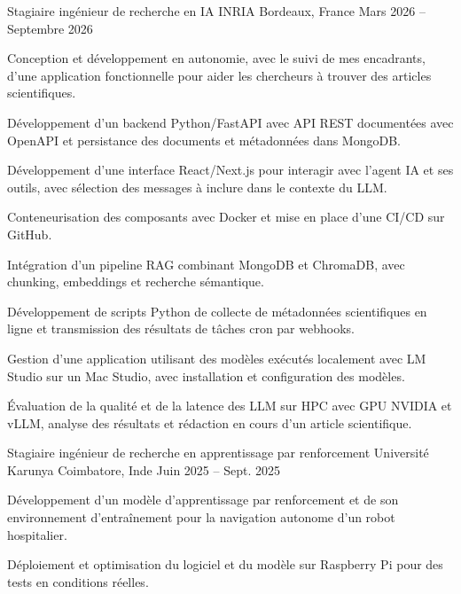 
\begin{cventries}
  \cventry
    {Stagiaire ingénieur de recherche en IA}
    {INRIA}
    {Bordeaux, France}
    {Mars 2026 -- Septembre 2026}
    {
      \begin{cvitems}
        \item {Conception et développement en autonomie, avec le suivi de mes encadrants, d’une application fonctionnelle pour aider les chercheurs à trouver des articles scientifiques.}
        \item {Développement d’un backend Python/FastAPI avec API REST documentées avec OpenAPI et persistance des documents et métadonnées dans MongoDB.}
        \item {Développement d’une interface React/Next.js pour interagir avec l’agent IA et ses outils, avec sélection des messages à inclure dans le contexte du LLM.}
        \item {Conteneurisation des composants avec Docker et mise en place d’une CI/CD sur GitHub.}
        \item {Intégration d’un pipeline RAG combinant MongoDB et ChromaDB, avec chunking, embeddings et recherche sémantique.}
        \item {Développement de scripts Python de collecte de métadonnées scientifiques en ligne et transmission des résultats de tâches cron par webhooks.}
        \item {Gestion d’une application utilisant des modèles exécutés localement avec LM Studio sur un Mac Studio, avec installation et configuration des modèles.}
        \item {Évaluation de la qualité et de la latence des LLM sur HPC avec GPU NVIDIA et vLLM, analyse des résultats et rédaction en cours d’un article scientifique.}
      \end{cvitems}
    }

  \cventry
    {Stagiaire ingénieur de recherche en apprentissage par renforcement}
    {Université Karunya}
    {Coimbatore, Inde}
    {Juin 2025 -- Sept. 2025}
    {
      \begin{cvitems}
        \item {Développement d’un modèle d’apprentissage par renforcement et de son environnement d’entraînement pour la navigation autonome d’un robot hospitalier.}
        \item {Déploiement et optimisation du logiciel et du modèle sur Raspberry Pi pour des tests en conditions réelles.}
      \end{cvitems}
    }
\end{cventries}
